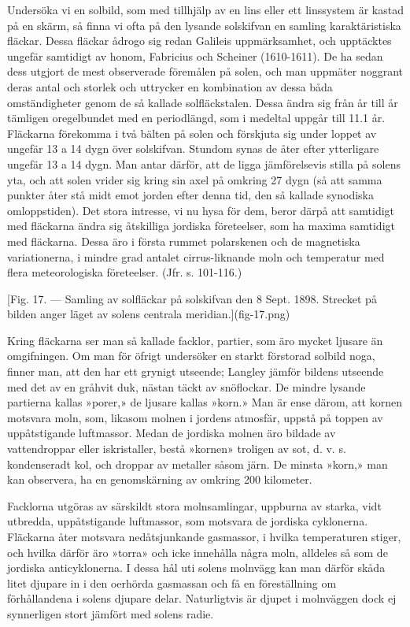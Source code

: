 \documentclass[a4paper, 12pt, oneside, swedish]{article}
\begin{document}
Undersöka vi en solbild, som med tillhjälp av en lins eller ett linssystem är kastad på en skärm, så finna vi ofta på den lysande solskifvan en samling karaktäristiska fläckar. Dessa fläckar ådrogo sig redan Galileis uppmärksamhet, och upptäcktes ungefär samtidigt av honom, Fabricius och Scheiner (1610-1611). De ha sedan dess utgjort de mest observerade föremålen på solen, och man uppmäter noggrant deras antal och storlek och uttrycker en kombination av dessa båda omständigheter genom de så kallade solfläckstalen. Dessa ändra sig från år till år tämligen oregelbundet med en periodlängd, som i medeltal uppgår till 11.1 år. Fläckarna förekomma i två bälten på solen och förskjuta sig under loppet av ungefär 13 a 14 dygn över solskifvan. Stundom synas de åter efter ytterligare ungefär 13 a 14 dygn. Man antar därför, att de ligga jämförelsevis stilla på solens yta, och att solen vrider sig kring sin axel på omkring 27 dygn (så att samma punkter åter stå midt emot jorden efter denna tid, den så kallade synodiska omloppstiden). Det stora intresse, vi nu hysa för dem, beror därpå att samtidigt med fläckarna ändra sig åtskilliga jordiska företeelser, som ha maxima samtidigt med fläckarna. Dessa äro i första rummet polarskenen och de magnetiska variationerna, i mindre grad antalet cirrus-liknande moln och temperatur med flera meteorologiska företeelser. (Jfr. s. 101-116.)

[Fig. 17. --- Samling av solfläckar på solskifvan den 8 Sept. 1898. Strecket på bilden anger läget av solens centrala meridian.](fig-17.png)

Kring fläckarna ser man så kallade facklor, partier, som äro mycket ljusare än omgifningen. Om man för öfrigt undersöker en starkt förstorad solbild noga, finner man, att den har ett grynigt utseende; Langley jämför bildens utseende med det av en gråhvit duk, nästan täckt av snöflockar. De mindre lysande partierna kallas »porer,» de ljusare kallas »korn.» Man är ense därom, att kornen motsvara moln, som, likasom molnen i jordens atmosfär, uppstå på toppen av uppåtstigande luftmassor. Medan de jordiska molnen äro bildade av vattendroppar eller iskristaller, bestå »kornen» troligen av sot, d. v. s. kondenseradt kol, och droppar av metaller såsom järn. De minsta »korn,» man kan observera, ha en genomskärning av omkring 200 kilometer.

Facklorna utgöras av särskildt stora molnsamlingar, uppburna av starka, vidt utbredda, uppåtstigande luftmassor, som motsvara de jordiska cyklonerna. Fläckarna åter motsvara nedåtsjunkande gasmassor, i hvilka temperaturen stiger, och hvilka därför äro »torra» och icke innehålla några moln, alldeles så som de jordiska anticyklonerna. I dessa hål uti solens molnvägg kan man därför skåda litet djupare in i den oerhörda gasmassan och få en föreställning om förhållandena i solens djupare delar. Naturligtvis är djupet i molnväggen dock ej synnerligen stort jämfört med solens radie.
\end{document}
